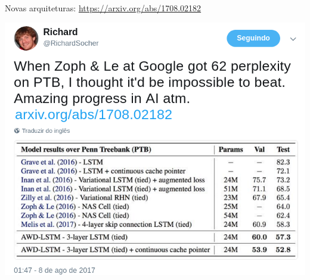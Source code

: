 \documentclass[10pt]{beamer}
\begin{document}
\begin{frame}{Novas arquiteturas: \url{https://arxiv.org/abs/1708.02182}}

\begin{center}
\includegraphics[scale=0.34]{images/SocherPTB.png}
\end{center}
\end{frame}
\end{document}
